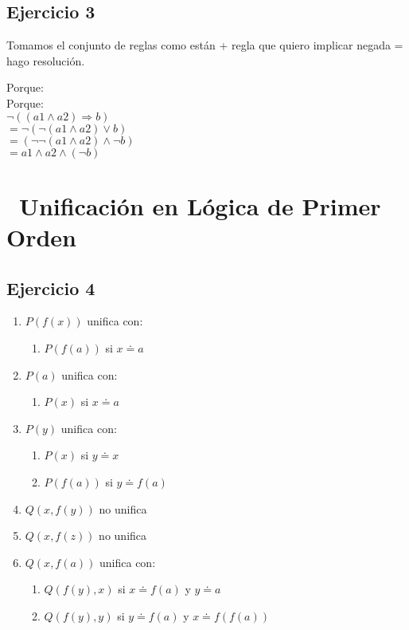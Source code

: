 \documentclass[10pt,a4paper]{article}
\begin{document}
\subsection{Ejercicio 3}
Tomamos el conjunto de reglas como están + regla que quiero implicar negada = hago resolución.

Porque:
\\
Porque: \\
$\lnot ((a1\land a2) \Rightarrow b)$ \\
$=\lnot (\lnot (a1\land a2) \lor b)$ \\
$=(\lnot \lnot (a1\land a2) \land \lnot b)$ \\
$=a1\land a2 \land (\lnot b)$

\section*{\ Unificación en Lógica de Primer Orden}
\subsection{Ejercicio 4}
    \begin{enumerate}
    \item $P(f(x)) $ unifica con:
        \begin{enumerate}
        \item $P(f(a)) $ si $ x \doteq a$
        \end{enumerate}
    \item $P(a) $ unifica con:
        \begin{enumerate}
            \item $P(x) $ si $ x \doteq a$
        \end{enumerate}
    \item $P(y) $ unifica con:
        \begin{enumerate}
            \item $P(x) $ si $ y \doteq x$
            \item $P(f(a)) $ si $ y \doteq f(a)$
        \end{enumerate}
    \item $Q(x,f(y)) $ no unifica
    \item $Q(x,f(z)) $ no unifica
    \item $Q(x,f(a)) $ unifica con:
        \begin{enumerate}
            \item $Q(f(y),x) $ si $ x \doteq f(a) $ y $ y \doteq a$
            \item $Q(f(y),y) $ si $ y \doteq f(a) $ y $ x \doteq f(f(a))$
        \end{enumerate}
    \end{enumerate}
\end{document}
